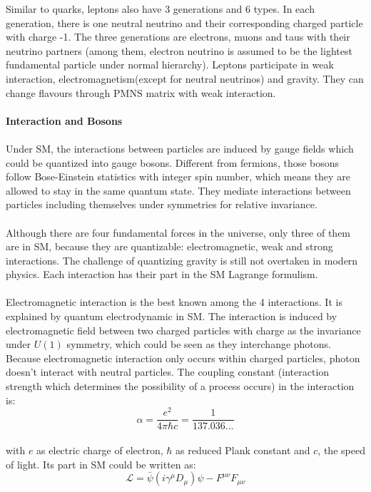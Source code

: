 Similar to quarks, leptons also have 3 generations and 6 types. In each generation, there is one neutral neutrino and their corresponding charged particle with charge -1. The three generations are electrons, muons and taus with their neutrino partners (among them, electron neutrino is assumed to be the lightest fundamental particle under normal hierarchy). Leptons participate in weak interaction, electromagnetism(except for neutral neutrinos) and gravity. They can change flavours through PMNS matrix with weak interaction.
\\
\\{\bf Interaction and Bosons}
\\
\\Under SM, the interactions between particles are induced by gauge fields which could be quantized into gauge bosons. Different from fermions, those bosons follow Bose-Einstein statistics with integer spin number, which means they are allowed to stay in the same quantum state. They mediate interactions between particles including themselves under symmetries for relative invariance. 
\\
\\Although there are four fundamental forces in the universe, only three of them are in SM, because they are quantizable: electromagnetic, weak and strong interactions. The challenge of quantizing gravity is still not overtaken in modern physics. Each interaction has their part in the SM Lagrange formulism.
\\
\\Electromagnetic interaction is the best known among the 4 interactions. It is explained by quantum electrodynamic in SM. The interaction is induced by electromagnetic field between two charged particles with charge as the invariance under $U(1)$ symmetry, which could be seen as they interchange photons. Because electromagnetic interaction only occurs within charged particles, photon doesn't interact with neutral particles. The coupling constant (interaction strength which determines the possibility of a process  occurs) in the interaction is:
\\
\begin{equation}
\alpha = \frac{e^2}{4\pi\hbar c}=\frac{1}{137.036...}
\end{equation}
\\
with $e$ as electric charge of electron, $\hbar$ as reduced Plank constant and $c$, the speed of light. Its part in SM could be written as:
\begin{equation}
\mathcal{L}=\bar{\psi}(i\gamma^{\mu}D_{\mu})\psi-F^{\mu\nu}F_{\mu\nu}
   \label{Eq:EM Lagrange}  
\end{equation}
